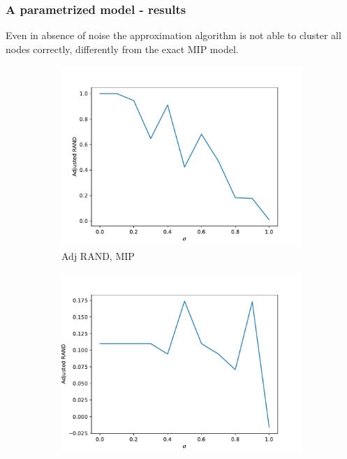 \documentclass{beamer}
\begin{document}
\begin{frame}[c]
	\frametitle{A parametrized model - results}

	Even in absence of noise the approximation algorithm is not able to cluster all
	nodes correctly, differently from the exact MIP model.

	\begin{figure}
		\begin{center}
			\begin{subfigure}[b]{0.3\textwidth}
				\centering
				\includegraphics[width=\textwidth]{out/synthetic_exact/model2_sigmas_adj_rand.pdf}
				\caption{Adj RAND, MIP}
				\label{fig:out/synthetic_exact/model2_sigmas_adj_rand.pdf}
			\end{subfigure}
			\begin{subfigure}[b]{0.3\textwidth}
				\centering
				\includegraphics[width=\textwidth]{out/synthetic_appr/model2_sigmas_adj_rand.pdf}

\end{subfigure}
\end{center}
\end{figure}
\end{frame}
\end{document}
